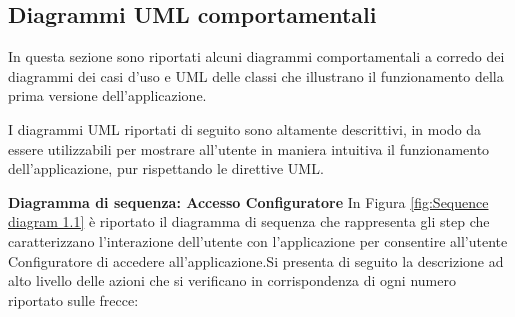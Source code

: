 \newpage
\subsection{Diagrammi UML comportamentali}
In questa sezione sono riportati alcuni diagrammi comportamentali a corredo dei diagrammi dei casi d'uso e UML delle classi che illustrano il funzionamento della prima versione dell'applicazione.

I diagrammi UML riportati di seguito sono altamente descrittivi, in modo da essere utilizzabili per mostrare all'utente in maniera intuitiva il funzionamento dell'applicazione, pur rispettando le direttive UML.\bigskip

\textbf{Diagramma di sequenza: Accesso Configuratore}\newline
In Figura \ref{fig:Sequence diagram 1.1} è riportato il diagramma di sequenza che rappresenta gli step che caratterizzano l'interazione dell'utente con l'applicazione per consentire all'utente Configuratore di accedere all'applicazione.\newline Si presenta di seguito la descrizione ad alto livello delle azioni che si verificano in corrispondenza di ogni numero riportato sulle frecce:


